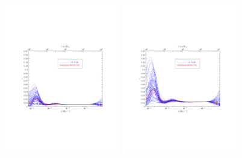 \documentclass[11pt]{article}
\def \halffigwidth{0.45\textwidth}
\begin{document}
\begin{figure}
  \includegraphics[width=\halffigwidth,  trim = 1in 3in 1in 3in]{nobicep_spline0_p11_r0d1_eps_traj.pdf}
  \includegraphics[width=\halffigwidth,  trim = 1in 3in 1in 3in]{nobicep_spline0_p11_r0d2_eps_traj.pdf}%

\end{figure}
\end{document}
